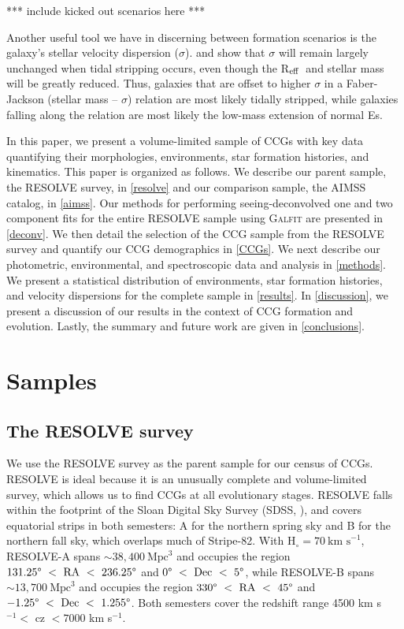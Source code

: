\documentclass[iop,apj]{emulateapj}
\newcommand{\Reff}{R$_{\rm eff}$}
\begin{document}
*** include kicked out scenarios here ***



Another useful tool we have in discerning between formation scenarios is the galaxy's stellar velocity dispersion ($\sigma$). \citet{Bender1992} and \citet{Bekki2003} show that $\sigma$ will remain largely unchanged when tidal stripping occurs, even though the \Reff\ and stellar mass will be greatly reduced. Thus, galaxies that are offset to higher $\sigma$ in a Faber-Jackson (stellar mass -- $\sigma$) relation \citep{faber1976} are most likely tidally stripped, while galaxies falling along the relation are most likely the low-mass extension of normal Es.


In this paper, we present a volume-limited sample of CCGs with key data quantifying their morphologies, environments, star formation histories, and kinematics. This paper is organized as follows. We describe our parent sample, the RESOLVE survey, in \autoref{resolve} and our comparison sample, the AIMSS catalog, in \autoref{aimss}. Our methods for performing seeing-deconvolved one and two component fits for the entire RESOLVE sample using \textsc{Galfit} are presented in \autoref{deconv}. We then detail the selection of the CCG sample from the RESOLVE survey and quantify our CCG demographics in \autoref{CCGs}. We next describe our photometric, environmental, and spectroscopic data and analysis in \autoref{methods}. We present a statistical distribution of environments, star formation histories, and velocity dispersions for the complete sample in \autoref{results}. In \autoref{discussion}, we present a discussion of our results in the context of CCG formation and evolution. Lastly, the summary and future work are given in \autoref{conclusions}.

\section{Samples}
\label{samples}

\subsection{The RESOLVE survey}
\label{resolve}

\noindent We use the RESOLVE survey \citep[][Kannappan et al., in prep]{Kannappan2008} as the parent sample for our census of CCGs. RESOLVE is ideal because it is an unusually complete and volume-limited survey, which allows us to find CCGs at all evolutionary stages. RESOLVE falls within the footprint of the Sloan Digital Sky Survey (SDSS, \citet{York2000}), and covers equatorial strips in both semesters: A for the northern spring sky and B for the northern fall sky, which overlaps much of Stripe-82. With $\text{H}_{\circ} = 70~\text{km~s}^{-1}$, RESOLVE-A spans $\sim38,400~\text{Mpc}^3$ and occupies the region $131.25\degree~<~\text{RA}~<~236.25\degree$ and $0\degree~<~\text{Dec}~<~5\degree$, while RESOLVE-B spans $\sim13,700~\text{Mpc}^3$ and occupies the region $330\degree~<~\text{RA}~<~45\degree$ and $-1.25\degree~<~\text{Dec}~<~1.255\degree$. Both semesters cover the redshift range 4500 km s$^{-1} <$ cz $< 7000$ km s$^{-1}$.
\end{document}
